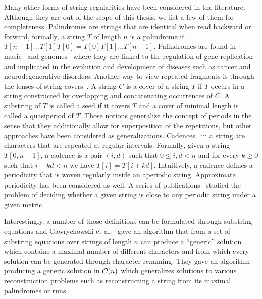 Many other forms of string regularities have been considered in the literature. Although they are out of the scope of this thesis, we list a few of them for completeness.
Palindromes are strings that are identical when read backward or forward, formally, a string $T$ of length $n$ is a palindrome if $T[n-1] \dots T[1]T[0] = T[0]T[1] \dots T[n-1]$. Palindromes are found in music~\cite{tablecannon,crabcannon} and genomes~\cite{brazda2016palindrome,svetec2021palindromes} where they are linked to the regulation of gene replication and implicated in the evolution and development of diseases such as cancer and neurodegenerative disorders.
Another way to view repeated fragments is through the lenses of string covers~\cite{iliopoulos1996covering}. A string $C$ is a cover of a string $T$ if $T$ occurs in a string constructed by overlapping and concatenating occurrences of $C$. A substring of $T$ is called a seed if it covers $T$ and a cover of minimal length is called a quasiperiod of $T$. 
Those notions generalize the concept of periods in the sense that they additionally allow for superposition of the repetitions, but other approaches have been considered as generalizations.
Cadences~\cite{AMIR20174} in a string are characters that are repeated at regular intervals. Formally, given a string $T[0,n-1]$, a cadence is a pair $(i,d)$ such that $0 \leq i,d < n$ and for every $k \geq 0$ such that $i+kd < n$ we have $T[i] = T[i+kd]$. Intuitively, a cadence defines a periodicity that is woven regularly inside an aperiodic string.
Approximate periodicity has been considered as well. A series of publications~\cite{SIM2001557,AMIR2015215,AmirICALP2010, KociumakaRADO2018, AMIR20182} studied the problem of deciding whether a given string is close to any periodic string under a given metric.

Interestingly, a number of those definitions can be formulated through substring equations and Gawrychowski et al.~\cite{GAWRYCHOWSKI2020174} gave an algorithm that from a set of substring equations over strings of length $n$ can produce a ``generic'' solution which contains a maximal number of different characters and from which every solution can be generated through character renaming. They gave an algorithm producing a generic solution in $\mathcal{O}(n)$ which generalizes solutions to various reconstruction problems such as reconstructing a string from its maximal palindromes or runs.

